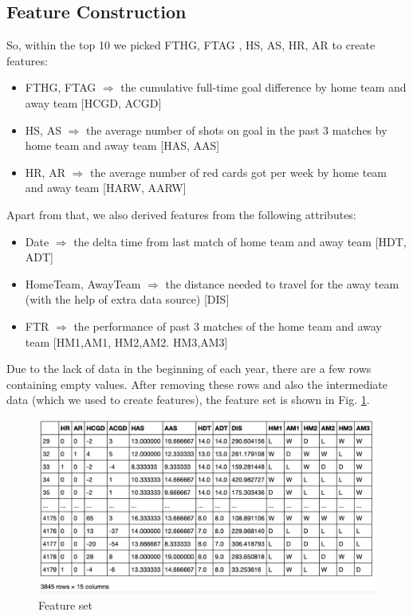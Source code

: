 \documentclass{article}
\begin{document}
\subsection{Feature Construction}
So, within the top 10 we picked FTHG, FTAG , HS, AS,  HR, AR to create features:
\begin{itemize}
\item FTHG, FTAG $\Rightarrow$ the cumulative full-time goal difference by home team and away team [HCGD, ACGD]
\item HS, AS $\Rightarrow$  the average number of shots on goal in the past 3 matches by home team and away team [HAS, AAS]
\item HR, AR $\Rightarrow$  the average number of red cards got per week by home team and away team [HARW, AARW]
\end{itemize}

Apart from that, we also derived features from the following attributes:
\begin{itemize}
\item Date $\Rightarrow$  the delta time from last match of home team and away team  [HDT, ADT]
\item HomeTeam, AwayTeam $\Rightarrow$  the distance needed to travel for the away team (with the help of extra data source) [DIS]
\item FTR $\Rightarrow$ the performance of past 3 matches of the home team and away team [HM1,AM1, HM2,AM2. HM3,AM3]
\end{itemize}

Due to the lack of data in the beginning of each year, there are a few rows containing empty values. After removing these rows and also the intermediate data (which we used to create features), the feature set is shown in  Fig. \ref{fig:featureSet}.

\begin{figure}[ht]
\centering
\includegraphics[scale=0.5]{graphs/featureSet.png}
\caption{Feature set}
\label{fig:featureSet}
\end{figure}
\end{document}
